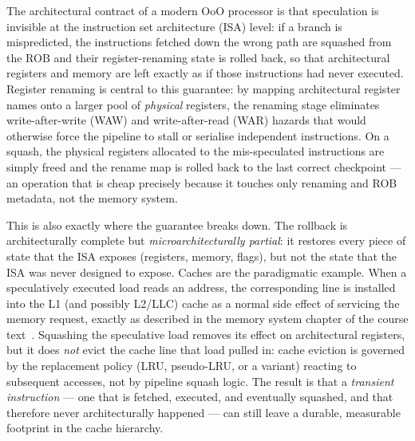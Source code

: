 \documentclass[11pt,a4paper]{article}
\begin{document}
The architectural contract of a modern OoO processor is that speculation is
invisible at the instruction set architecture (ISA) level: if a branch is
mispredicted, the instructions fetched down the wrong path are squashed from the
ROB and their register-renaming state is rolled back, so that architectural
registers and memory are left exactly as if those instructions had never
executed. Register renaming is central to this guarantee: by mapping
architectural register names onto a larger pool of \emph{physical} registers,
the renaming stage eliminates write-after-write (WAW) and write-after-read
(WAR) hazards that would otherwise force the pipeline to stall or serialise
independent instructions. On a squash, the physical registers allocated to the
mis-speculated instructions are simply freed and the rename map is rolled back
to the last correct checkpoint --- an operation that is cheap precisely because
it touches only renaming and ROB metadata, not the memory system.

This is also exactly where the guarantee breaks down. The rollback is
architecturally complete but \emph{microarchitecturally partial}: it restores
every piece of state that the ISA exposes (registers, memory, flags), but not
the state that the ISA was never designed to expose. Caches are the paradigmatic
example. When a speculatively executed load reads an address, the corresponding
line is installed into the L1 (and possibly L2/LLC) cache as a normal side
effect of servicing the memory request, exactly as described in the memory
system chapter of the course text~\cite{sarangi2025basic}. Squashing the
speculative load removes its effect on architectural registers, but it does
\emph{not} evict the cache line that load pulled in: cache eviction is governed
by the replacement policy (LRU, pseudo-LRU, or a variant) reacting to subsequent
accesses, not by pipeline squash logic. The result is that a \emph{transient
instruction} --- one that is fetched, executed, and eventually squashed, and
that therefore never architecturally happened --- can still leave a durable,
measurable footprint in the cache hierarchy.
\end{document}
